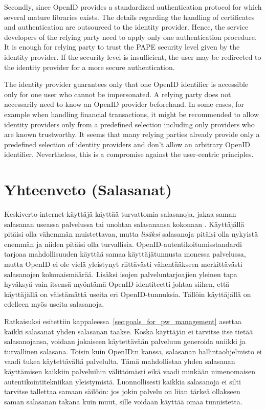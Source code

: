 \documentclass[english,gradu]{tktltiki}
\begin{document}
                 Secondly, since OpenID provides a standardized authentication protocol for which several mature libraries exists. The details regarding the handling of certificates and authentication are outsourced to the identity provider. Hence, the service developers of the relying party need to apply only one authentication procedure. It is enough for relying party to trust the PAPE security level given by the identity provider. If the security level is insufficient, the user may be redirected to the identity provider for a more secure authentication.

                 The identity provider guarantees only that one OpenID identifier is accessible only for one user who cannot be impersonated. A relying party does not necessarily need to know an OpenID provider beforehand. In some cases, for example when handling financial transactions, it might be recommended to allow identity providers only from a predefined selection including only providers who are known trustworthy. It seems that many relying parties already provide only a predefined selection of identity providers and don't allow an arbitrary OpenID identifier. Nevertheless, this is a compromise against the user-centric principles.



\section{Yhteenveto (Salasanat)}

Keskiverto internet-käyttäjä käyttää turvattomia salasanoja, jakaa saman salasanan useassa palvelussa tai unohtaa salasanansa kokonaan \cite{study_of_passwords_07, password_management_strategies_06, generating_and_remembering_pws_04, users_are_not_the_enemy_99}. Käyttäjällä pitäisi olla vähemmän muistettavaa, mutta \emph{lisäksi} salasanoja pitäisi olla nykyistä enemmän ja niiden pitäisi olla turvallisia.
OpenID-autentikoitumisstandardi tarjoaa mahdollisuuden käyttää samaa käyttäjätunnusta monessa palvelussa, mutta OpenID ei ole vielä yleistynyt riittävästi vähentääkseen merkittävästi salasanojen kokonaismäärää. Lisäksi isojen palveluntarjoajien yleinen tapa hyväksyä vain itsensä myöntämä OpenID-identiteetti johtaa siihen, että käyttäjällä on väistämättä useita eri OpenID-tunnuksia. Tällöin käyttäjällä on edelleen myös useita salasanoja.

Ratkaisuksi esitettiin kappaleessa~\ref{sec:goals_for_pw_management} asettaa kaikki salasanat yhden salasanan taakse. Koska käyttäjän ei tarvitse itse tietää salasanojansa, voidaan jokaiseen käytettävään palveluun generoida uniikki ja turvallinen salasana. Toisin kuin OpenID:n kanssa, salasanan hallintaohjelmisto ei vaadi tukea käytettävältä palvelulta. Tämä mahdollistaa yhden salasanan käyttämisen kaikkiin palveluihin välittömästi eikä vaadi minkään nimenomaisen autentikointitekniikan yleistymistä. Luonnollisesti kaikkia salasanoja ei silti tarvitse tallettaa samaan säilöön: jos jokin palvelu on liian tärkeä ollakseen saman salasanan takana kuin muut, sille voidaan käyttää omaa tunnistetta.
\end{document}
